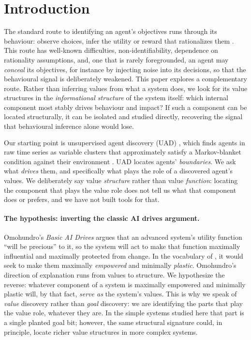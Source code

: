 \documentclass[11pt]{article}
\begin{document}
\section{Introduction}

The standard route to identifying an agent's objectives runs through its behaviour: observe
choices, infer the utility or reward that rationalizes them
\citep{ng2000irl,russell1998learning}. This route has well-known difficulties, non-identifiability, dependence on
rationality assumptions, and, one that is rarely
foregrounded, an agent may \emph{conceal} its objectives, for instance by injecting
noise into its decisions, so that the behavioural signal is deliberately weakened.
This paper explores a complementary route. Rather than inferring values from what a
system does, we look for its value structures in the \emph{informational structure} of
the system itself: which internal component most stably drives behaviour and impact?
If such a component can be located structurally, it can be isolated and studied
directly, recovering the signal that behavioural inference alone would lose.

Our starting point is unsupervised agent discovery (UAD) \citep{zarncke2025uad}, which
finds agents in raw time series as variable clusters that approximately satisfy a
Markov-blanket condition against their environment
\citep{friston2013life,kirchhoff2018blankets}. UAD locates agents' \emph{boundaries}.
We ask what \emph{drives} them, and specifically what plays the role of a discovered
agent's values. We deliberately say value \emph{structure}
rather than value \emph{function}: locating the component that plays the value role does
not tell us what that component does or prefers, and we have not built tools for that.

\paragraph{The hypothesis: inverting the classic AI drives argument.}
Omohundro's \emph{Basic AI Drives} \citep{omohundro2008drives} argues that an advanced
system's utility function ``will be precious'' to it, so the system will act to make
that function maximally influential and maximally protected from change. In the
vocabulary of \citet{abel2025plasticity}, it would seek to make them maximally
\emph{empowered} and minimally \emph{plastic}. Omohundro's direction of explanation
runs from values to structure. We hypothesize the reverse: whatever component of a system is maximally
empowered and minimally plastic will, by that fact, \emph{serve as} the system's
values. This is why we speak of \emph{value} discovery rather than \emph{goal}
discovery: we are identifying the parts that play the value role, whatever they are. In
the simple systems studied here that part is a single planted goal bit; however, the same
structural signature could, in principle, locate richer value structures in more complex systems.
\end{document}
